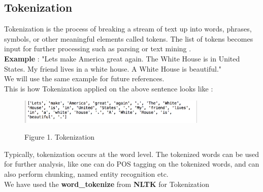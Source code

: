 \documentclass[fleqn,10pt]{SelfArx} %
\begin{document}
\subsection{Tokenization}
 Tokenization is the process of breaking a stream of text up into words, phrases, symbols, or other meaningful elements called tokens. The list of tokens becomes input for further processing such as parsing or text mining \cite{REF:2}.
\\\textbf{Example} : "Lets make America great again. The White House is in United States. My friend lives in a white house. A White House is beautiful."
 \\We will use the same example for future references.
\\This is how Tokenization applied on the above sentence looks like :
\begin{figure}[h]
\begin{minipage}[b]{1.0\linewidth}
  \centering
  \centerline{\includegraphics[width=9cm]{token}}
  \centerline{Figure 1. Tokenization}\medskip
\end{minipage}
\end{figure}

\newpage

Typically, tokenization occurs at the word level. The tokenized words can be used for further analysis, like one can do POS tagging on the tokenized words, and can also perform chunking, named entity recognition etc.
\\We have used the \textbf{word\_tokenize} from \textbf{NLTK} for Tokenization
\end{document}
